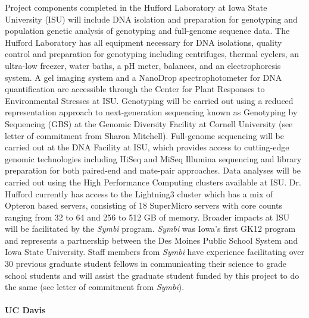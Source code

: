 Project components completed in the Hufford Laboratory at Iowa State University (ISU) will include DNA isolation and preparation for genotyping and population genetic analysis of genotyping and full-genome sequence data. The Hufford Laboratory has all equipment necessary for DNA isolations, quality control and preparation for genotyping including centrifuges, thermal cyclers, an ultra-low freezer, water baths, a pH meter, balances, and an electrophoresis system. A gel imaging system and a NanoDrop spectrophotometer for DNA quantification are accessible through the Center for Plant Responses to Environmental Stresses at ISU. Genotyping will be carried out using a reduced representation approach to next-generation sequencing known as Genotyping by Sequencing (GBS) at the Genomic Diversity Facility at Cornell University (see letter of commitment from Sharon Mitchell). Full-genome sequencing will be carried out at the DNA Facility at ISU, which provides access to cutting-edge genomic technologies including HiSeq and MiSeq Illumina sequencing and library preparation for both paired-end and mate-pair approaches. Data analyses will be carried out using the High Performance Computing clusters available at ISU. Dr. Hufford currently has access to the Lightning3 cluster which has a mix of Opteron based servers, consisting of 18 SuperMicro servers with core counts ranging from 32 to 64 and 256 to 512 GB of memory.  Broader impacts at ISU will be facilitated by the \emph{Symbi} program. \emph{Symbi} was Iowa's first GK12 program and represents a partnership between the Des Moines Public School System and Iowa State University.  Staff members from \emph{Symbi} have experience facilitating over 30 previous graduate student fellows in communicating their science to grade school students and will assist the graduate student funded by this project to do the same (see letter of commitment from \emph{Symbi}).

\paragraph{\textbf{UC Davis}}\

